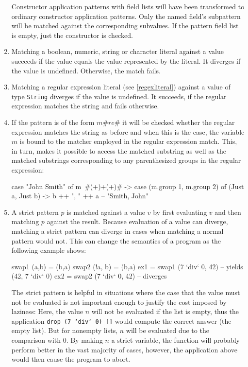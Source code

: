 \begin{enumerate}
Constructor application patterns with field lists will have been transformed to ordinary constructor application patterns. Only the named field's subpattern will be matched against the corresponding subvalues. If the pattern field list is empty, just the constructor is checked.
\item Matching a boolean, numeric, string or character literal against a value succeeds if the value equals the value represented by the literal. It diverges if the value is undefined. Otherwise, the match fails.
\item Matching a regular expression literal (see \autoref{regexliteral}) against a value of type \texttt{String} diverges if the value is undefined. It succeeds, if the regular expression matches the string and fails otherwise.
\item If the pattern is of the form $m$\#$re$\# it will be checked whether the regular expression matches the string as before and when this is the case, the variable $m$ is bound to the matcher employed in the regular expression match. This, in turn, makes it possible to access the matched substring as well as the matched substrings corresponding to any parenthesized groups in the regular expression:
\begin{code}
case "John Smith" of
    m~#(\w+)\s+(\w+)# -> case (m.group 1, m.group 2) of
             (Just a, Just b) -> b ++ ", " ++ a  -- "Smith, John"
\end{code}
\item \label{strict pattern} A strict pattern \sym{!}$p$ is matched against a value $v$ by first evaluating $v$ and then matching $p$ against the result. Because evaluation of a value can diverge, matching a strict pattern can diverge in cases  when matching a normal pattern would not. This can change the semantics of a program as the following example shows:
\begin{code}
swap1 (a,b)   = (b,a)
swap2 (!a, b) = (b,a)
ex1 = swap1 (7 `div` 0, 42)   -- yields (42, 7 `div` 0)
ex2 = swap2 (7 `div` 0, 42)   -- diverges
\end{code}

The strict pattern is helpful in situations where the case that the value must not be evaluated is not important enough to justify the cost imposed by laziness:
Here, the value $n$ will not be evaluated if the list is empty, thus the application \texttt{drop (7 `div` 0) []} would compute the correct answer (the empty list). But for nonempty lists, $n$ will be evaluated due to the comparison with 0. By making $n$ a strict variable, the function will probably perform better in the vast majority of cases, however, the application above would then cause the program to abort.


\end{enumerate}
